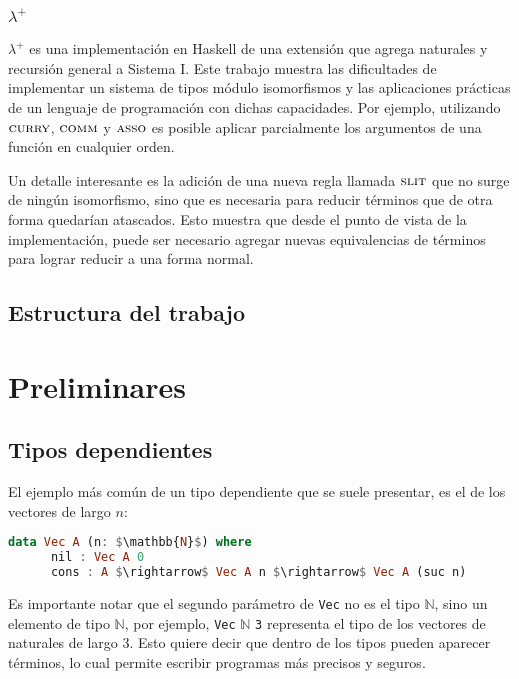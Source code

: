 \documentclass[]{report}
\begin{document}
	\subsection{$\lambda^+$}
	$\lambda^+$ \cite{lambda-plus} es una implementación en Haskell de una extensión que agrega naturales y recursión general a Sistema I.
	Este trabajo muestra las dificultades de implementar un sistema de tipos módulo isomorfismos y las aplicaciones prácticas de un lenguaje de programación con dichas capacidades.
	Por ejemplo, utilizando $\textsc{curry}$, $\textsc{comm}$ y $\textsc{asso}$ es posible aplicar parcialmente los argumentos de una función en cualquier orden.
	
	Un detalle interesante es la adición de una nueva regla llamada $\textsc{slit}$ que no surge de ningún isomorfismo, sino que es necesaria para reducir términos que de otra forma quedarían atascados.
	Esto muestra que desde el punto de vista de la implementación, puede ser necesario agregar nuevas equivalencias de términos para lograr reducir a una forma normal.
	
	
	\section{Estructura del trabajo}
	
	\chapter{Preliminares}
	
	\section{Tipos dependientes}
	El ejemplo más común de un tipo dependiente que se suele presentar, es el de los vectores de largo $n$:
	
	\begin{lstlisting}[mathescape, language=Haskell]
	data Vec A (n: $\mathbb{N}$) where
	  nil : Vec A 0
	  cons : A $\rightarrow$ Vec A n $\rightarrow$ Vec A (suc n)
	\end{lstlisting}
	
	Es importante notar que el segundo parámetro de \verb|Vec| no es el tipo $\mathbb{N}$, sino un elemento de tipo $\mathbb{N}$, por ejemplo, \verb|Vec| $\mathbb{N}$ \verb|3| representa el tipo de los vectores de naturales de largo 3.
	Esto quiere decir que dentro de los tipos pueden aparecer términos, lo cual permite escribir programas más precisos y seguros.
	
\end{document}

